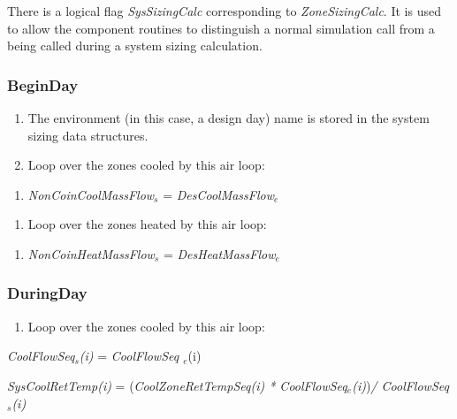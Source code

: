 There is a logical flag \emph{SysSizingCalc} corresponding to \emph{ZoneSizingCalc}. It is used to allow the component routines to distinguish a normal simulation call from a being called during a system sizing calculation.

\subsubsection{BeginDay}\label{beginday}

\begin{enumerate}
\def\labelenumi{(\arabic{enumi})}
\item
  The environment (in this case, a design day) name is stored in the system sizing data structures.
\item
  Loop over the zones cooled by this air loop: 
\end{enumerate}

\begin{enumerate}
\def\labelenumi{(\alph{enumi})}
\tightlist
\item
  \emph{NonCoinCoolMassFlow\(_{s}\)} = \emph{DesCoolMassFlow\(_{e}\)} 
\end{enumerate}

\begin{enumerate}
\def\labelenumi{(\arabic{enumi})}
\setcounter{enumi}{2}
\tightlist
\item
  Loop over the zones heated by this air loop: 
\end{enumerate}

\begin{enumerate}
\def\labelenumi{(\alph{enumi})}
\tightlist
\item
  \emph{NonCoinHeatMassFlow\(_{s}\)} = \emph{DesHeatMassFlow\(_{e}\)}
\end{enumerate}

\subsubsection{DuringDay}\label{duringday}

\begin{enumerate}
\def\labelenumi{(\arabic{enumi})}
\tightlist
\item
  Loop over the zones cooled by this air loop:
\end{enumerate}

\emph{CoolFlowSeq\(_{s}\)(i)} = \emph{CoolFlowSeq \(_{e}\)}(i)

\emph{SysCoolRetTemp(i)} = (\emph{CoolZoneRetTempSeq(i) * CoolFlowSeq\(_{e}\)(i)})\emph{/ CoolFlowSeq\(_{s}\)(i)}

